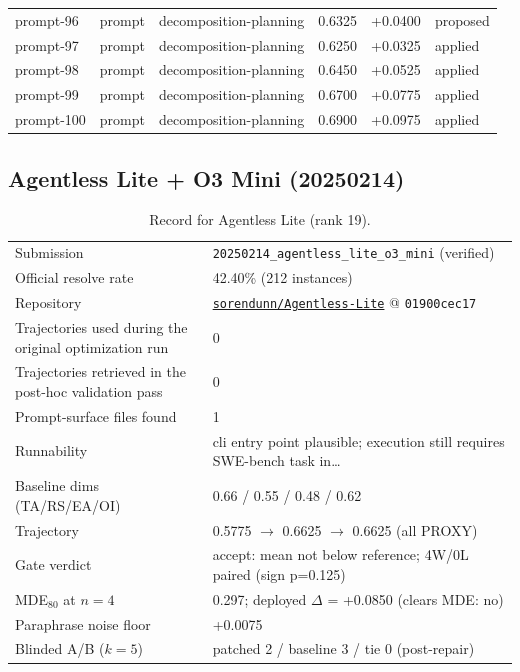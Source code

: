 \begin{center}
\begin{longtable}{llp{5.2cm}rrl}
prompt-96 & prompt & decomposition-planning & 0.6325 & +0.0400 & proposed \\
prompt-97 & prompt & decomposition-planning & 0.6250 & +0.0325 & applied \\
prompt-98 & prompt & decomposition-planning & 0.6450 & +0.0525 & applied \\
prompt-99 & prompt & decomposition-planning & 0.6700 & +0.0775 & applied \\
prompt-100 & prompt & decomposition-planning & 0.6900 & +0.0975 & applied \\
\bottomrule\end{longtable}\end{center}
\clearpage
\subsection{Agentless Lite + O3 Mini (20250214)}
\label{app:agent19}
\begin{table}[h]\centering\scriptsize
\caption{Record for Agentless Lite (rank 19).}
\begin{tabular}{lp{8.2cm}}\toprule
Submission & \texttt{20250214\_\allowbreak{}agentless\_\allowbreak{}lite\_\allowbreak{}o3\_\allowbreak{}mini} (verified) \\
Official resolve rate & 42.40\% (212 instances) \\
Repository & \href{https://github.com/sorendunn/Agentless-Lite}{\texttt{sorendunn/Agentless-Lite}} @ \texttt{01900cec17} \\
Trajectories used during the original optimization run & 0 \\
Trajectories retrieved in the post-hoc validation pass & 0 \\
Prompt-surface files found & 1 \\
Runnability & cli entry point plausible; execution still requires SWE-bench task in\ldots{} \\
Baseline dims (TA/RS/EA/OI) & 0.66 / 0.55 / 0.48 / 0.62 \\
Trajectory & 0.5775 $\to$ 0.6625 $\to$ 0.6625 (all PROXY) \\
Gate verdict & accept: mean not below reference; 4W/0L paired (sign p=0.125) \\
MDE$_{80}$ at $n{=}4$ & 0.297; deployed $\Delta$ = +0.0850 (clears MDE: no) \\
Paraphrase noise floor & +0.0075 \\
Blinded A/B ($k{=}5$) & patched 2 / baseline 3 / tie 0 (post-repair) \\
\bottomrule\end{tabular}\end{table}
